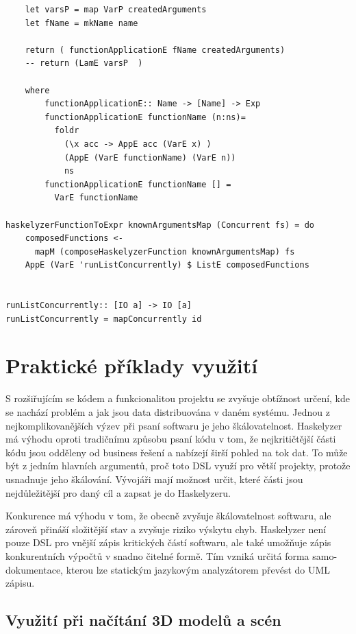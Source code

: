 \documentclass[male,czech]{kithesis}
\begin{document}
\begin{verbatim}
    let varsP = map VarP createdArguments 
    let fName = mkName name

    return ( functionApplicationE fName createdArguments)
    -- return (LamE varsP  )

    where
        functionApplicationE:: Name -> [Name] -> Exp
        functionApplicationE functionName (n:ns)= 
          foldr 
            (\x acc -> AppE acc (VarE x) ) 
            (AppE (VarE functionName) (VarE n)) 
            ns
        functionApplicationE functionName [] = 
          VarE functionName

haskelyzerFunctionToExpr knownArgumentsMap (Concurrent fs) = do
    composedFunctions <- 
      mapM (composeHaskelyzerFunction knownArgumentsMap) fs
    AppE (VarE 'runListConcurrently) $ ListE composedFunctions


runListConcurrently:: [IO a] -> IO [a]
runListConcurrently = mapConcurrently id

\end{verbatim}

\chapter{Praktické příklady využití}

S rozšiřujícím se kódem a funkcionalitou projektu se zvyšuje obtížnost určení, 
kde se nachází problém a jak jsou data distribuována v daném systému. 
Jednou z nejkomplikovanějších výzev při psaní softwaru je jeho škálovatelnost. 
Haskelyzer má výhodu oproti tradičnímu způsobu psaní kódu v tom, 
že nejkritičtější části kódu jsou odděleny od business řešení a nabízejí širší pohled na tok dat. 
To může být z jedním hlavních argumentů, proč toto DSL využí pro větší projekty,
protože usnadnuje jeho škálování.
Vývojáři mají možnost určit, které části jsou nejdůležitější pro daný cíl a zapsat je do Haskelyzeru.

Konkurence má výhodu v tom, že obecně zvyšuje škálovatelnost softwaru, 
ale zároveň přináší složitější stav a zvyšuje riziko výskytu chyb. 
Haskelyzer není pouze DSL pro vnější zápis kritických částí softwaru, 
ale také umožňuje zápis konkurentních výpočtů v snadno čitelné formě. 
Tím vzniká určitá forma samo-dokumentace, 
kterou lze statickým jazykovým analyzátorem převést do UML zápisu.

\section{Využití při načítání 3D modelů a scén}
\end{document}
